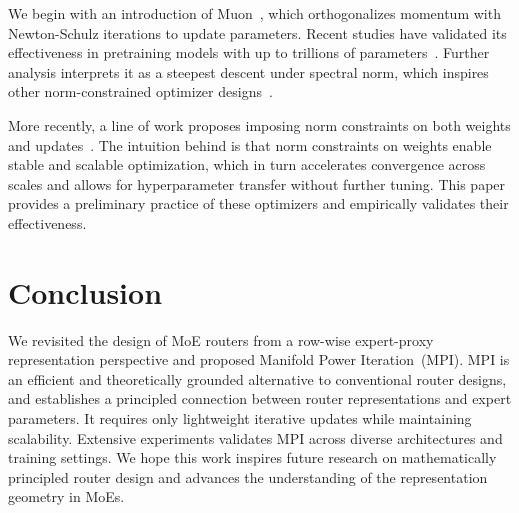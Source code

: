 \documentclass[11pt]{article}
\newcommand{\Name}{Manifold Power Iteration}
\begin{document}
We begin with an introduction of Muon~\cite{muon}, which orthogonalizes momentum with Newton-Schulz iterations to update parameters.
Recent studies have validated its effectiveness in pretraining models with up to trillions of parameters~\cite{k2, deepseekv4}.
Further analysis interprets it as a steepest descent under spectral norm, which inspires other norm-constrained optimizer designs~\cite{scion}.

More recently, a line of work proposes imposing norm constraints on both weights and updates~\cite{hyperball, sso}.
The intuition behind is that norm constraints on weights enable stable and scalable optimization, which in turn accelerates convergence across scales and allows for hyperparameter transfer without further tuning.
This paper provides a preliminary practice of these optimizers and empirically validates their effectiveness.

\section{Conclusion}
We revisited the design of MoE routers from a row-wise expert-proxy representation perspective and proposed \Name\ (MPI).
MPI is an efficient and theoretically grounded alternative to conventional router designs, and establishes a principled connection between router representations and expert parameters.
It requires only lightweight iterative updates while maintaining scalability.
Extensive experiments validates MPI across diverse architectures and training settings.
We hope this work inspires future research on mathematically principled router design and advances the understanding of the representation geometry in MoEs.



\end{document}
